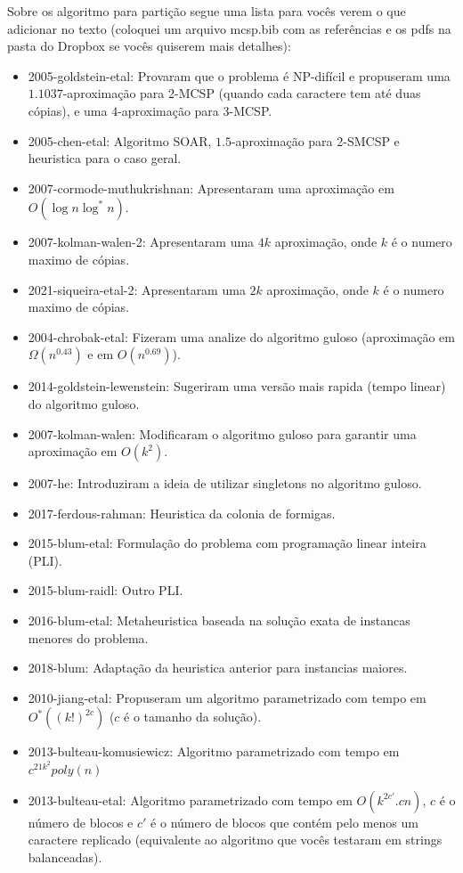 
{\color{red}
Sobre os algoritmo para partição segue uma lista para vocês verem o que adicionar no texto (coloquei um arquivo mcsp.bib com as referências e os pdfs na pasta do Dropbox se vocês quiserem mais detalhes):
\begin{itemize}
    \item  2005-goldstein-etal: Provaram que o problema é NP-difícil e propuseram uma $1.1037$-aproximação para 2-MCSP (quando cada caractere tem até duas cópias), e uma $4$-aproximação para 3-MCSP.
    \item 2005-chen-etal: Algoritmo SOAR, $1.5$-aproximação para 2-SMCSP e heuristica para o caso geral.
    \item 2007-cormode-muthukrishnan: Apresentaram uma aproximação em $O(\log n \log^* n)$.
    \item 2007-kolman-walen-2: Apresentaram uma $4k$ aproximação, onde $k$ é o numero maximo de cópias.
    \item 2021-siqueira-etal-2: Apresentaram uma $2k$ aproximação, onde $k$ é o numero maximo de cópias.
    \item 2004-chrobak-etal: Fizeram uma analize do algoritmo guloso (aproximação em $\Omega(n^{0.43})$ e em $O(n^{0.69})$).
    \item 2014-goldstein-lewenstein: Sugeriram uma versão mais rapida (tempo linear) do algoritmo guloso.
    \item 2007-kolman-walen: Modificaram o algoritmo guloso para garantir uma aproximação em $O(k^2)$.
    \item 2007-he: Introduziram a ideia de utilizar singletons no algoritmo guloso.
    \item 2017-ferdous-rahman: Heuristica da colonia de formigas.
    \item 2015-blum-etal: Formulação do problema com programação linear inteira (PLI).
    \item 2015-blum-raidl: Outro PLI.
    \item 2016-blum-etal: Metaheuristica baseada na solução exata de instancas menores do problema.
    \item 2018-blum: Adaptação da heuristica anterior para instancias maiores.
    \item 2010-jiang-etal: Propuseram um algoritmo parametrizado com tempo em $O^*((k!)^{2c})$ ($c$ é o tamanho da solução).
    \item 2013-bulteau-komusiewicz: Algoritmo parametrizado com tempo em $c^{21k^2} poly(n)$
    \item 2013-bulteau-etal: Algoritmo parametrizado com tempo em $O(k^{2c'} . cn)$, $c$ é o número de blocos e $c'$ é o número de blocos que contém pelo menos um caractere replicado (equivalente ao algoritmo que vocês testaram em strings balanceadas).
\end{itemize}
}
